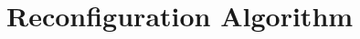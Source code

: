 \documentclass[conference]{IEEEtran}
\begin{document}

\section{Reconfiguration Algorithm} \label{algo}
\end{document}

